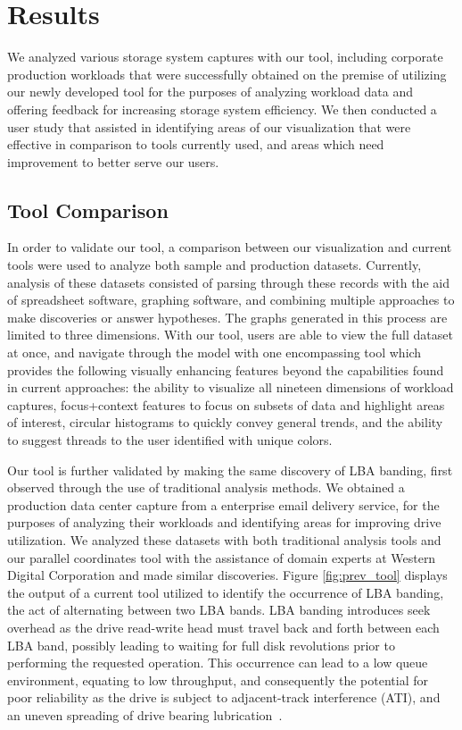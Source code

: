 \documentclass[journal]{vgtc}                %
\begin{document}
\section{Results}
\label{results}
We analyzed various storage system captures with our tool, including corporate production workloads that were successfully obtained on the premise of utilizing our newly developed tool for the purposes of analyzing workload data and offering feedback for increasing storage system efficiency. We then conducted a user study that assisted in identifying areas of our visualization that were effective in comparison to tools currently used, and areas which need improvement to better serve our users.

\subsection{Tool Comparison}
In order to validate our tool, a comparison between our visualization and current tools were used to analyze both sample and production datasets. Currently, analysis of these datasets consisted of parsing through these records with the aid of spreadsheet software, graphing software, and combining multiple approaches to make discoveries or answer hypotheses. The graphs generated in this process are limited to three dimensions. With our tool, users are able to view the full dataset at once, and navigate through the model with one encompassing tool which provides the following visually enhancing features beyond the capabilities found in current approaches: the ability to visualize all nineteen dimensions of workload captures, focus+context features to focus on subsets of data and highlight areas of interest, circular histograms to quickly convey general trends, and the ability to suggest threads to the user identified with unique colors.

Our tool is further validated by making the same discovery of LBA banding, first observed through the use of traditional analysis methods. We obtained a production data center capture from a enterprise email delivery service, for the purposes of analyzing their workloads and identifying areas for improving drive utilization. We analyzed these datasets with both traditional analysis tools and our parallel coordinates tool with the assistance of domain experts at Western Digital Corporation and made similar discoveries. Figure \ref{fig:prev_tool} displays the output of a current tool utilized to identify the occurrence of LBA banding, the act of alternating between two LBA bands. LBA banding introduces seek overhead as the drive read-write head must travel back and forth between each LBA band, possibly leading to waiting for full disk revolutions prior to performing the requested operation. This occurrence can lead to a low queue environment, equating to low throughput, and consequently the potential for poor reliability as the drive is subject to adjacent-track interference (ATI), and an uneven spreading of drive bearing lubrication~\cite{internal:collab}. 
\end{document}
